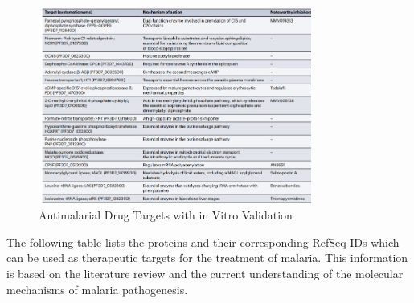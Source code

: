 \documentclass[twoside]{article}
\begin{document}
\begin{figure}[H]
    \centering
    \includegraphics[width=0.8\textwidth]{drugtargets3.jpg}
    \caption{Antimalarial Drug Targets with in Vitro Validation}
    \label{fig: Antimalarial Drug Targets with in Vitro Validation}
\end{figure}

The following table lists the proteins and their corresponding RefSeq IDs which can be used as therapeutic targets for the treatment of malaria.
This information is based on the literature review and the current understanding of the molecular mechanisms of malaria pathogenesis.


\end{document}
